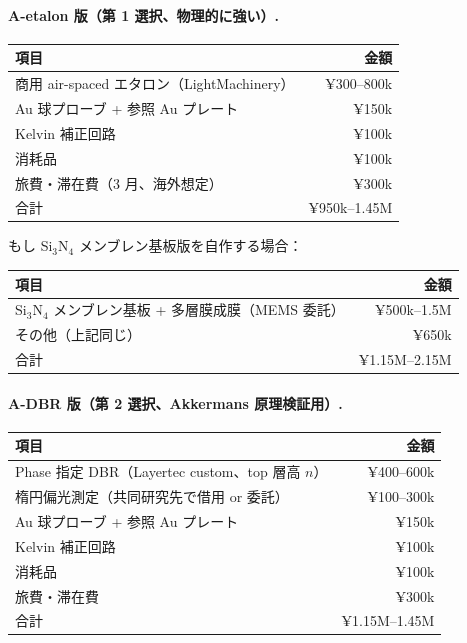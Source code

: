 \documentclass[11pt,a4paper]{article}
\def\textbf#1{#1}%
\begin{document}
\paragraph{A-etalon 版（第 1 選択、物理的に強い）.}
\begin{center}
\begin{tabular}{lr}
\toprule
項目 & 金額 \\
\midrule
商用 air-spaced エタロン（LightMachinery） & ¥300--800k \\
Au 球プローブ + 参照 Au プレート & ¥150k \\
Kelvin 補正回路 & ¥100k \\
消耗品 & ¥100k \\
旅費・滞在費（3 月、海外想定） & ¥300k \\
\midrule
\textbf{合計} & \textbf{¥950k--1.45M} \\
\bottomrule
\end{tabular}
\end{center}

もし Si$_3$N$_4$ メンブレン基板版を自作する場合：
\begin{center}
\begin{tabular}{lr}
\toprule
項目 & 金額 \\
\midrule
Si$_3$N$_4$ メンブレン基板 + 多層膜成膜（MEMS 委託） & ¥500k--1.5M \\
その他（上記同じ） & ¥650k \\
\midrule
\textbf{合計} & \textbf{¥1.15M--2.15M} \\
\bottomrule
\end{tabular}
\end{center}

\paragraph{A-DBR 版（第 2 選択、Akkermans 原理検証用）.}
\begin{center}
\begin{tabular}{lr}
\toprule
項目 & 金額 \\
\midrule
Phase 指定 DBR（Layertec custom、top 層高 $n$） & ¥400--600k \\
楕円偏光測定（共同研究先で借用 or 委託） & ¥100--300k \\
Au 球プローブ + 参照 Au プレート & ¥150k \\
Kelvin 補正回路 & ¥100k \\
消耗品 & ¥100k \\
旅費・滞在費 & ¥300k \\
\midrule
\textbf{合計} & \textbf{¥1.15M--1.45M} \\
\bottomrule
\end{tabular}
\end{center}
\end{document}
